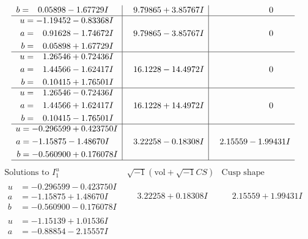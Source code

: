 \documentclass[1p]{elsarticle_modified}
\theoremstyle{definition}
\newcommand{\I}{\sqrt{-1}}
\begin{document}
$$\begin{array}{c|c|c}
\begin{aligned}
b &= \phantom{-}0.05898 - 1.67729 I\end{aligned}
 & \phantom{-}9.79865 + 3.85767 I & \phantom{-0.000000 } 0 \\ \hline\begin{aligned}
u &= -1.19452 - 0.83368 I \\
a &= \phantom{-}0.91628 - 1.74672 I \\
b &= \phantom{-}0.05898 + 1.67729 I\end{aligned}
 & \phantom{-}9.79865 - 3.85767 I & \phantom{-0.000000 } 0 \\ \hline\begin{aligned}
u &= \phantom{-}1.26546 + 0.72436 I \\
a &= \phantom{-}1.44566 - 1.62417 I \\
b &= \phantom{-}0.10415 + 1.76501 I\end{aligned}
 & \phantom{-}16.1228 - 14.4972 I & \phantom{-0.000000 } 0 \\ \hline\begin{aligned}
u &= \phantom{-}1.26546 - 0.72436 I \\
a &= \phantom{-}1.44566 + 1.62417 I \\
b &= \phantom{-}0.10415 - 1.76501 I\end{aligned}
 & \phantom{-}16.1228 + 14.4972 I & \phantom{-0.000000 } 0 \\ \hline\begin{aligned}
u &= -0.296599 + 0.423750 I \\
a &= -1.15875 - 1.48670 I \\
b &= -0.560900 + 0.176078 I\end{aligned}
 & \phantom{-}3.22258 - 0.18308 I & \phantom{-}2.15559 - 1.99431 I\\
 \hline 
 \end{array}$$\newpage$$\begin{array}{c|c|c}  
\text{Solutions to }I^u_{1}& \I (\text{vol} + \sqrt{-1}CS) & \text{Cusp shape}\\
 \hline 
\begin{aligned}
u &= -0.296599 - 0.423750 I \\
a &= -1.15875 + 1.48670 I \\
b &= -0.560900 - 0.176078 I\end{aligned}
 & \phantom{-}3.22258 + 0.18308 I & \phantom{-}2.15559 + 1.99431 I \\ \hline\begin{aligned}
u &= -1.15139 + 1.01536 I \\
a &= -0.88854 - 2.15557 I \\

\end{aligned}
\end{array}$$
\end{document}
